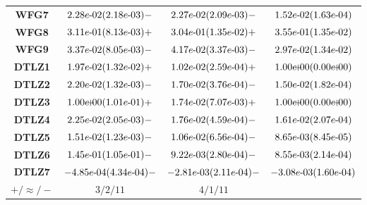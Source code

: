 \documentclass{article}
\begin{document}
\begin{table}[!htp]
\begin{tiny}
\begin{tabular}{c|ccc}
\textbf{WFG7} & ${2.28e\makebox[0.1cm]{-}02(2.18e\makebox[0.1cm]{-}03)-} $ & $ \cellcolor{gray25} {2.27e\makebox[0.1cm]{-}02(2.09e\makebox[0.1cm]{-}03)-} $ & $ \cellcolor{gray95} 1.52e\makebox[0.1cm]{-}02(1.63e\makebox[0.1cm]{-}04)$ \\
\textbf{WFG8} & $\cellcolor{gray25} {3.11e\makebox[0.1cm]{-}01(8.13e\makebox[0.1cm]{-}03)+} $ & $ \cellcolor{gray95} {3.04e\makebox[0.1cm]{-}01(1.35e\makebox[0.1cm]{-}02)+} $ & $ 3.55e\makebox[0.1cm]{-}01(1.35e\makebox[0.1cm]{-}02)$ \\
\textbf{WFG9} & $\cellcolor{gray25} {3.37e\makebox[0.1cm]{-}02(8.05e\makebox[0.1cm]{-}03)-} $ & $ {4.17e\makebox[0.1cm]{-}02(3.37e\makebox[0.1cm]{-}03)-} $ & $ \cellcolor{gray95} 2.97e\makebox[0.1cm]{-}02(1.34e\makebox[0.1cm]{-}02)$ \\
\textbf{DTLZ1} & $\cellcolor{gray25} {1.97e\makebox[0.1cm]{-}02(1.32e\makebox[0.1cm]{-}02)+} $ & $ \cellcolor{gray95} {1.02e\makebox[0.1cm]{-}02(2.59e\makebox[0.1cm]{-}04)+} $ & $ 1.00e\makebox[0.1cm]{+}00(0.00e\makebox[0.1cm]{+}00)$ \\
\textbf{DTLZ2} & ${2.20e\makebox[0.1cm]{-}02(1.32e\makebox[0.1cm]{-}03)-} $ & $ \cellcolor{gray25} {1.70e\makebox[0.1cm]{-}02(3.76e\makebox[0.1cm]{-}04)-} $ & $ \cellcolor{gray95} 1.50e\makebox[0.1cm]{-}02(1.82e\makebox[0.1cm]{-}04)$ \\
\textbf{DTLZ3} & ${1.00e\makebox[0.1cm]{+}00(1.01e\makebox[0.1cm]{-}01)+} $ & $ \cellcolor{gray95} {1.74e\makebox[0.1cm]{-}02(7.07e\makebox[0.1cm]{-}03)+} $ & $ \cellcolor{gray25} 1.00e\makebox[0.1cm]{+}00(0.00e\makebox[0.1cm]{+}00)$ \\
\textbf{DTLZ4} & ${2.25e\makebox[0.1cm]{-}02(2.05e\makebox[0.1cm]{-}03)-} $ & $ \cellcolor{gray25} {1.76e\makebox[0.1cm]{-}02(4.59e\makebox[0.1cm]{-}04)-} $ & $ \cellcolor{gray95} 1.61e\makebox[0.1cm]{-}02(2.07e\makebox[0.1cm]{-}04)$ \\
\textbf{DTLZ5} & ${1.51e\makebox[0.1cm]{-}02(1.23e\makebox[0.1cm]{-}03)-} $ & $ \cellcolor{gray25} {1.06e\makebox[0.1cm]{-}02(6.56e\makebox[0.1cm]{-}04)-} $ & $ \cellcolor{gray95} 8.65e\makebox[0.1cm]{-}03(8.45e\makebox[0.1cm]{-}05)$ \\
\textbf{DTLZ6} & ${1.45e\makebox[0.1cm]{-}01(1.05e\makebox[0.1cm]{-}01)-} $ & $ \cellcolor{gray25} {9.22e\makebox[0.1cm]{-}03(2.80e\makebox[0.1cm]{-}04)-} $ & $ \cellcolor{gray95} 8.55e\makebox[0.1cm]{-}03(2.14e\makebox[0.1cm]{-}04)$ \\
\textbf{DTLZ7} & ${-4.85e\makebox[0.1cm]{-}04(4.34e\makebox[0.1cm]{-}04)-} $ & $ \cellcolor{gray25} {-2.81e\makebox[0.1cm]{-}03(2.11e\makebox[0.1cm]{-}04)-} $ & $ \cellcolor{gray95} -3.08e\makebox[0.1cm]{-}03(1.60e\makebox[0.1cm]{-}04)$ \\
  \hline
\textbf{$+/\approx/-$} & $3/2/11 $ & $ 4/1/11$ \\
  \end{tabular}
  \end{tiny}
\end{table}
\end{document}
